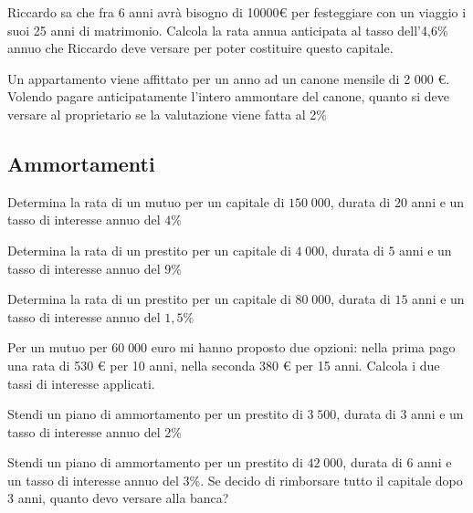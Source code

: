 \begin{esercizio}
Riccardo sa che fra 6 anni avrà bisogno di 10000€ per festeggiare con un 
viaggio i suoi 25 anni di matrimonio. Calcola la rata annua anticipata al 
tasso dell'4,6\% annuo che Riccardo deve versare per poter costituire 
questo capitale.
\end{esercizio}
\begin{esercizio}
Un appartamento viene affittato per un anno ad un canone mensile di 2 000 
€. Volendo pagare anticipatamente l'intero ammontare del canone, quanto si 
deve versare al proprietario se la valutazione viene fatta al 2\%
\end{esercizio}


\subsection{Ammortamenti}
\begin{esercizio}
Determina la rata di un mutuo per un capitale di \(150\;000\), 
durata di \(20\) anni e un tasso di interesse annuo del \(4\%\)
\end{esercizio}
\begin{esercizio}
Determina la rata di un prestito per un capitale di \(4\;000\), 
durata di \(5\) anni e un tasso di interesse annuo del \(9\%\)
\end{esercizio}
\begin{esercizio}
Determina la rata di un prestito per un capitale di \(80\;000\), 
durata di \(15\) anni e un tasso di interesse annuo del \(1,5\%\)
\end{esercizio}
\begin{esercizio}
Per un mutuo per \(60\;000\) euro mi hanno proposto due opzioni: nella prima 
pago una rata di 530 € per 10 anni, nella seconda 380 € per 15 anni. 
Calcola i due tassi di interesse applicati.
\end{esercizio}


\begin{esercizio}
Stendi un piano di ammortamento per un prestito di \(3\;500\), durata di \(3\) 
anni e un tasso di interesse annuo del \(2\%\)
\end{esercizio}
\begin{esercizio}
Stendi un piano di ammortamento per un prestito di \(42\;000\), durata di \(6\) 
anni e un tasso di interesse annuo del \(3\%\). Se decido di rimborsare tutto 
il capitale dopo 3 anni, quanto devo versare alla banca?
\end{esercizio}


